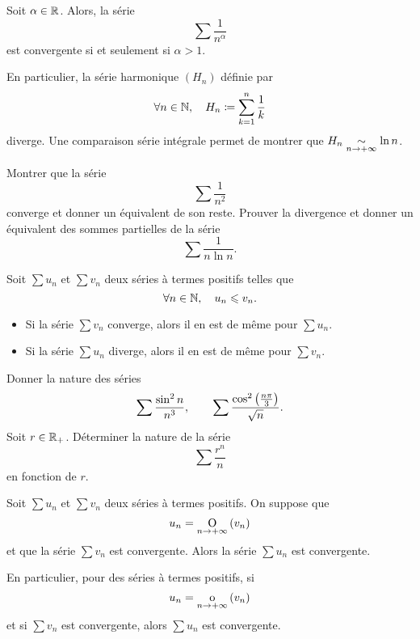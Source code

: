 \documentclass{magnolia}
\begin{document}
\begin{proposition}[nom={Série de \nom{Riemann}}]
Soit $\alpha\in\mathbb{R}$. Alors, la série
\[\sum \frac{1}{n^\alpha}\]
est convergente si et seulement si $\alpha > 1$.
\end{proposition}

\begin{remarqueUnique}
\remarque En particulier, la série harmonique $(H_n)$ définie par
  \[\forall n\in\mathbb{N},\quad H_n\coloneqq\sum_{k=1}^n \frac{1}{k}\]
  diverge. Une comparaison série intégrale permet de montrer que
  $H_n\underset{n\rightarrow +\infty}{\sim} \ln n$.
\end{remarqueUnique}

\begin{exos}
\exo Montrer que la série
  \[\sum \frac{1}{n^2}\]
  converge et donner un équivalent de son reste.
\exo Prouver la divergence et donner un équivalent des sommes partielles de la série
  \[\sum \frac{1}{n \ln n}.\]
\end{exos}

\begin{proposition}
Soit $\sum u_n$ et $\sum v_n$ deux séries à termes positifs telles que
\[\forall n\in\mathbb{N},\quad u_n\leqslant v_n.\]
\begin{itemize}
\item Si la série $\sum v_n$ converge, alors il en est de même pour $\sum u_n$.
\item Si la série $\sum u_n$ diverge, alors il en est de même pour $\sum v_n$.
\end{itemize}
\end{proposition}

\begin{exos}
\exo Donner la nature des séries
  \[\sum\frac{\sin^2 n}{n^3},\qquad\sum\frac{\cos^2\left(\frac{n\pi}{3}\right)}{\sqrt{n}}.\]
\exo Soit $r\in\mathbb{R}_+$. Déterminer la nature de la série
  \[\sum \frac{r^n}{n}\]
  en fonction de $r$.
\end{exos}

\begin{proposition}
Soit $\sum u_n$ et $\sum v_n$ deux séries à termes positifs. On suppose que
\[u_n=\underset{n \rightarrow +\infty}{\text{O}}\left(v_n\right)\]
et que la série $\sum v_n$ est convergente. Alors la série $\sum u_n$ est convergente.
\end{proposition}

\begin{remarqueUnique}
\remarque En particulier, pour des séries à termes positifs, si
\[u_n=\underset{n \rightarrow +\infty}{\text{o}}\left(v_n\right)\]
et si $\sum v_n$ est convergente, alors $\sum u_n$ est convergente. 
\end{remarqueUnique}
\end{document}
